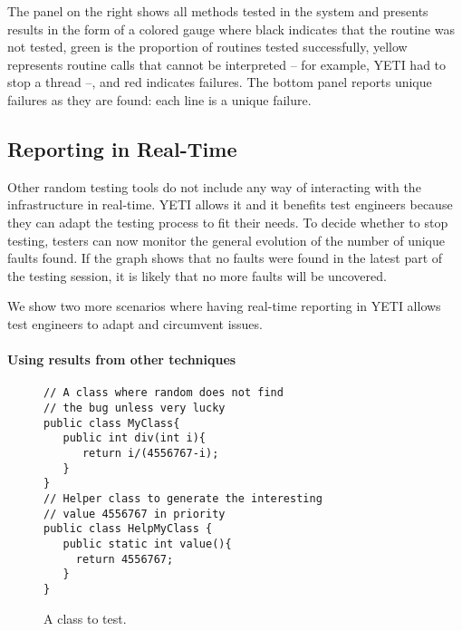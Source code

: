 The panel on the right shows all methods tested in the system and presents results in the form 
of a colored gauge where black indicates that the routine was not tested, green is the proportion
of routines tested successfully, yellow represents routine calls that cannot be interpreted
-- for example,	 YETI had to stop a thread --, and red indicates failures.
The bottom panel reports unique failures as they are found: each line is a unique failure.


\subsection{Reporting in Real-Time}

Other random testing tools do not include any way of interacting with the infrastructure in real-time.
YETI allows it and it benefits test engineers because they can adapt the testing process to fit their needs. 
To decide whether to stop testing, testers can now monitor the general evolution of the number of unique 
faults found. If the graph shows that no faults were found in the latest part of the testing session, it is likely 
that no more faults will be uncovered. 

We show two more scenarios where having real-time reporting in YETI allows test engineers to adapt and circumvent issues.

\paragraph{Using results from other techniques}
\begin{figure}[ht!]
{\small
\begin{verbatim}
// A class where random does not find 
// the bug unless very lucky
public class MyClass{
   public int div(int i){
      return i/(4556767-i);
   }
}
// Helper class to generate the interesting 
// value 4556767 in priority
public class HelpMyClass {
   public static int value(){
     return 4556767; 
   }
}
\end{verbatim}
}
\caption{A class to test.}\label{fig:myClass}
\end{figure}

